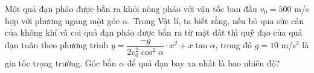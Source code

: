 \begin{ex}%
	Một quả đạn pháo được bắn ra khỏi nòng pháo với vận tốc ban đầu $ v_0=500$ m/s hợp với phương ngang một góc $ \alpha $. Trong Vật lí, ta biết rằng, nếu bỏ qua sức cản của không khí và coi quả đạn pháo được bắn ra từ mặt đất thì quỹ đạo của quả đạn  tuân theo phương trình $ y=\dfrac{-g}{2v_0^2\cos^2\alpha}\cdot x^2+x\tan \alpha $, trong đó $g = 10$ m/s$ ^2 $ là gia tốc trọng trường. Góc bắn $ \alpha $ để quả đạn bay xa nhất là bao nhiêu độ?
\end{ex}

